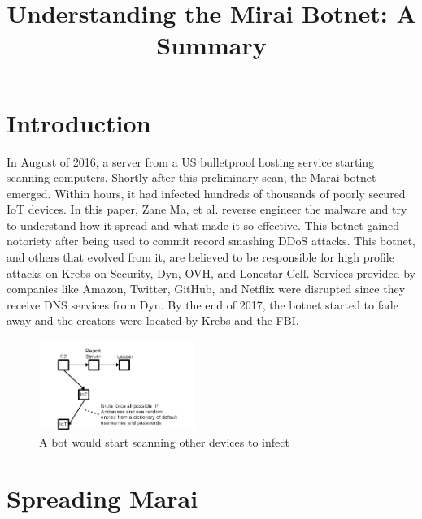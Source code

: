 \documentclass[conference]{IEEEtran}
\begin{document}
\title{Understanding the Mirai Botnet: A Summary}

\author{
}

\maketitle

\section{Introduction}

In August of 2016, a server from a US bulletproof hosting service starting scanning computers. Shortly after this preliminary scan, the Marai botnet emerged. Within hours, it had infected hundreds of thousands of poorly secured IoT devices. In this paper, Zane Ma, et al. reverse engineer the malware and try to understand how it spread and what made it so effective. This botnet gained notoriety after being used to commit record smashing DDoS attacks. This botnet, and others that evolved from it, are believed to be responsible for high profile attacks on Krebs on Security, Dyn, OVH, and Lonestar Cell. Services provided by companies like Amazon, Twitter, GitHub, and Netflix were disrupted since they receive DNS services from Dyn. By the end of 2017, the botnet started to fade away and the creators were located by Krebs and the FBI.

\begin{figure}[b]
\centerline{\includegraphics[width=0.45\textwidth]{../fig1.png}}
\caption{A bot would start scanning other devices to infect}
\label{scan}
\end{figure}

\section{Spreading Marai}
\end{document}
